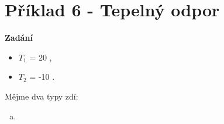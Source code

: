 \documentclass{article}
\begin{document}
\section*{Příklad 6 - Tepelný odpor}

\textbf{Zadání}

\begin{itemize}
    \item $T_1$ = 20 \ueqCELS,
    \item $T_2$ = -10 \ueqCELS.
\end{itemize}

Mějme dva typy zdí:
\begin{enumerate}[a)]
    \item
\end{enumerate}
\end{document}
